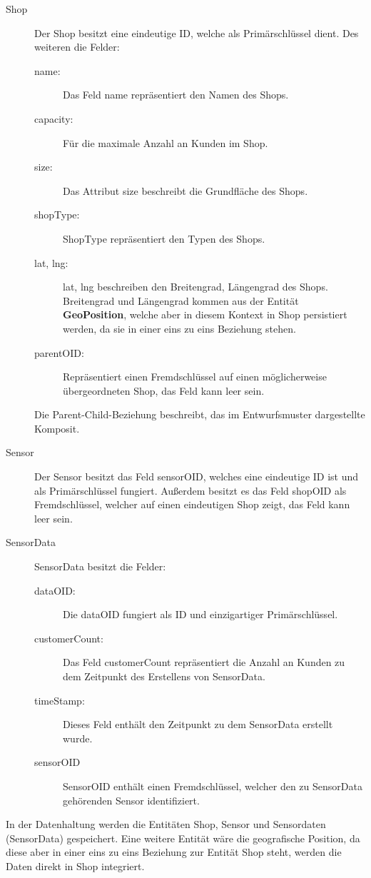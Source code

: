 \documentclass[runningheads]{llncs}
\begin{document}
\begin{description}
	\item[Shop] Der Shop besitzt eine eindeutige ID, welche als Primärschlüssel dient. 
	Des weiteren die Felder: 
	\begin{description}
		\item [name:] Das Feld name repräsentiert den Namen des Shops.
		\item [capacity:] Für die maximale Anzahl an Kunden im Shop.
		\item [size:] Das Attribut size beschreibt die Grundfläche des Shops.
		\item [shopType:] ShopType repräsentiert den Typen des Shops.
		\item [lat, lng:] lat, lng beschreiben den Breitengrad, Längengrad des Shops. Breitengrad und Längengrad kommen aus der Entität \textbf{GeoPosition}, welche aber in diesem Kontext in Shop persistiert werden, da sie in einer eins zu eins Beziehung stehen.
		\item [parentOID:] Repräsentiert einen Fremdschlüssel auf einen möglicherweise übergeordneten Shop, das Feld kann leer sein.
	\end{description} 
	Die Parent-Child-Beziehung beschreibt, das im Entwurfsmuster dargestellte Komposit.
	\item[Sensor] Der Sensor besitzt das Feld sensorOID, welches eine eindeutige ID ist und als Primärschlüssel fungiert. Außerdem besitzt es das Feld shopOID als Fremdschlüssel, welcher auf einen eindeutigen Shop zeigt, das Feld kann leer sein.
	\item[SensorData] SensorData besitzt die Felder:
	\begin{description}
		\item[dataOID:] Die dataOID fungiert als ID und einzigartiger Primärschlüssel.
		\item[customerCount:] Das Feld customerCount repräsentiert die Anzahl an Kunden zu dem Zeitpunkt des Erstellens von SensorData.
		\item[timeStamp:] Dieses Feld enthält den Zeitpunkt zu dem SensorData erstellt wurde.
		\item[sensorOID] SensorOID enthält einen Fremdschlüssel, welcher den zu SensorData gehörenden Sensor identifiziert.
	\end{description}
\end{description}

In der Datenhaltung werden die Entitäten Shop, Sensor und Sensordaten (SensorData) gespeichert.
Eine weitere Entität wäre die geografische Position, da diese aber in einer eins zu eins Beziehung zur Entität Shop steht, werden die Daten direkt in Shop integriert.
\end{document}
